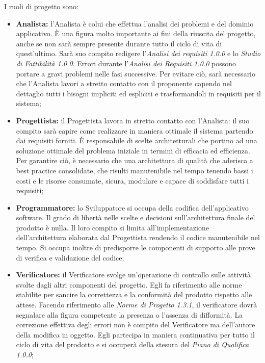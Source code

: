    			\noindent I ruoli di progetto sono:
   			\begin{itemize}
   				\item \textbf{Analista:} l'Analista è colui che effettua l'analisi dei problemi e del dominio applicativo. \`{E} una figura molto importante ai fini della riuscita del progetto, anche se non sarà sempre presente durante tutto il ciclo di vita di quest'ultimo. Sarà suo compito redigere l'\textit{Analisi dei requisiti 1.0.0\doc} e lo \textit{Studio di Fattibilità 1.0.0\doc}. Errori durante l'\textit{Analisi dei Requisiti 1.0.0\doc} possono portare a gravi problemi nelle fasi successive. Per evitare ciò, sarà necessario che l'Analista lavori a stretto contatto con il proponente capendo nel dettaglio tutti i bisogni impliciti ed espliciti e trasformandoli in requisiti per il sistema;
   				\item \textbf{Progettista:} il Progettista lavora in stretto contatto con l'Analista: il suo compito sarà capire come realizzare in maniera ottimale il sistema partendo dai requisiti forniti. È responsabile di scelte architetturali che portino ad una soluzione ottimale del problema iniziale in termini di efficacia ed efficienza. Per garantire ciò, è necessario che una architettura di qualità che aderisca a best practice consolidate, che risulti manutenibile nel tempo tenendo bassi i costi e le risorse consumate, sicura, modulare e capace di soddisfare tutti i requisiti;
   				\item \textbf{Programmatore:} lo Sviluppatore si occupa della codifica dell'applicativo software. Il grado di libertà nelle scelte e decisioni sull'architettura finale del prodotto è nulla. Il loro compito si limita all'implementazione dell'architettura elaborata dal Progettista rendendo il codice manutenibile nel tempo. Si occupa inoltre di predisporre le componenti di supporto alle prove di verifica e validazione del codice;
   				\item \textbf{Verificatore:} il Verificatore svolge un'operazione di controllo sulle attività svolte dagli altri componenti del progetto. Egli fa riferimento alle norme stabilite per sancire la correttezza e la conformità del prodotto rispetto alle attese. Facendo riferimento alle \textit{Norme di Progetto 1.3.1\doc}, il verificatore dovrà segnalare alla figura competente la presenza o l'assenza di difformità. La correzione effettiva degli errori non è compito del Verificatore ma dell'autore della modifica in oggetto. Egli partecipa in maniera continuativa per tutto il ciclo di vita del prodotto e si occuperà della stesura del \textit{Piano di Qualifica 1.0.0\docs};

\end{itemize}
